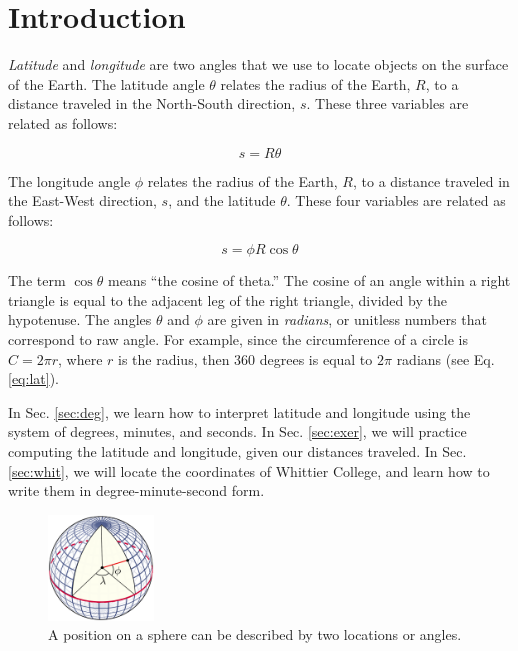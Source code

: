 \documentclass[12pt]{article}
\begin{document}
\twocolumn
\maketitle
\small

\section{Introduction}

\textit{Latitude} and \textit{longitude} are two angles that we use to locate objects on the surface of the Earth.  The latitude angle $\theta$ relates the radius of the Earth, $R$, to a distance traveled in the North-South direction, $s$.  These three variables are related as follows:

\begin{equation}
s = R\theta \label{eq:lat}
\end{equation}

The longitude angle $\phi$ relates the radius of the Earth, $R$, to a distance traveled in the East-West direction, $s$, and the latitude $\theta$.  These four variables are related as follows:

\begin{equation}
s = \phi R \cos\theta \label{eq:lon}
\end{equation}

The term $\cos\theta$ means ``the cosine of theta.''  The cosine of an angle within a right triangle is equal to the adjacent leg of the right triangle, divided by the hypotenuse.  The angles $\theta$ and $\phi$ are given in \textit{radians}, or unitless numbers that correspond to raw angle.  For example, since the circumference of a circle is $C = 2\pi r$, where $r$ is the radius, then 360 degrees is equal to $2\pi$ radians (see Eq. \ref{eq:lat}).

In Sec. \ref{sec:deg}, we learn how to interpret latitude and longitude using the system of degrees, minutes, and seconds.  In Sec. \ref{sec:exer}, we will practice computing the latitude and longitude, given our distances traveled.  In Sec. \ref{sec:whit}, we will locate the coordinates of Whittier College, and learn how to write them in degree-minute-second form.
 
\begin{figure}
\centering
\includegraphics[width=0.25\textwidth]{latlon.pdf}
\caption{\label{fig:latlon} A position on a sphere can be described by two locations or angles.}
\end{figure}
\end{document}
